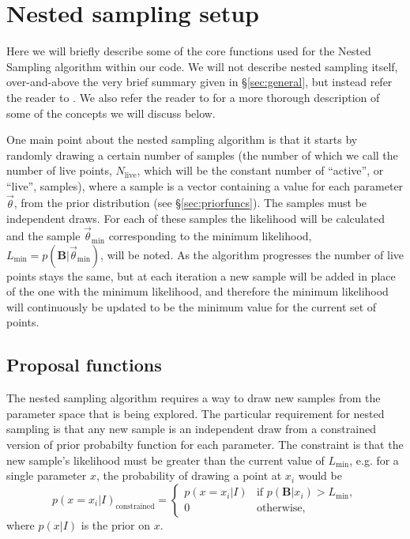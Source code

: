 \section{Nested sampling setup}

Here we will briefly describe some of the core functions used for the Nested Sampling algorithm within our code. We will
not describe nested sampling itself, over-and-above the very brief summary given in \S\ref{sec:general}, but instead refer
the reader to \citet{Veitch:2010}. We also refer the reader to \citet{2015PhRvD..91d2003V} for a more thorough description
of some of the concepts we will discuss below.

One main point about the nested sampling algorithm is that it starts by randomly drawing a certain number of samples (the number of
which we call the number of live points, $N_{\text{live}}$, which will be the constant number of ``active'', or ``live'', samples),  
where a sample is a vector containing a value for each parameter $\vec{\theta}$, from the prior distribution (see \S\ref{sec:priorfuncs}).
The samples must be independent draws. For each of these samples the likelihood will be calculated and the sample $\vec{\theta}_{\text{min}}$
corresponding to the minimum likelihood, $L_{\text{min}} = p(\mathbf{B}|\vec{\theta}_{\text{min}})$, will be noted. As the algorithm
progresses the number of live points stays the
same, but at each iteration a new sample will be added in place of the one with the minimum likelihood, and therefore the
minimum likelihood will continuously be updated to be the minimum value for the current set of points.

\subsection{Proposal functions}\label{sec:proposals}

The nested sampling algorithm requires a way to draw new samples from the parameter space that is being explored. The
particular requirement for nested sampling is that any new sample is an independent draw from a constrained version
of prior probabilty function for each parameter. The constraint is that the new sample's likelihood must be greater
than the current value of $L_{\text{min}}$, e.g. for a single parameter $x$, the probability of drawing a point at $x_i$ 
would be
\begin{equation}
 p(x=x_i|I)_{\text{constrained}} = \begin{cases}
             p(x=x_i|I) & \text{if~} p(\mathbf{B}|x_i) > L_{\text{min}}, \\
             0 & \text{otherwise},
            \end{cases}
\end{equation}
where $p(x|I)$ is the prior on $x$.

